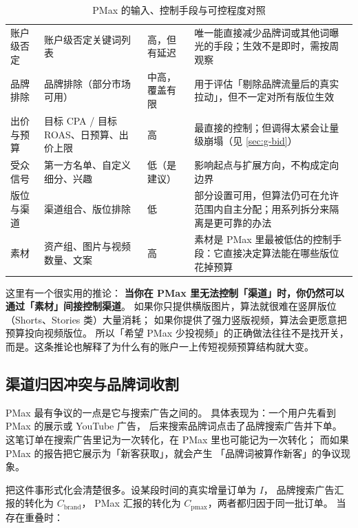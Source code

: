\begin{table}[htbp]
\centering
\caption{PMax 的输入、控制手段与可控程度对照}
\label{tab:g-pmax-control}
\small
\begin{tabularx}{\textwidth}{L{2.5cm} L{2.7cm} L{3.0cm} Y}
\toprule
{} &  &  &  \\
\midrule
账户级否定 & 账户级否定关键词列表 & 高，但有延迟 & 唯一能直接减少品牌词或其他词曝光的手段；生效不是即时，需按周观察 \\
\addlinespace
品牌排除 & 品牌排除（部分市场可用） & 中高，覆盖有限 & 用于评估「剔除品牌流量后的真实拉动」，但不一定对所有版位生效 \\
\addlinespace
出价与预算 & 目标 CPA / 目标 ROAS、日预算、出价上限 & 高 & 最直接的控制；但调得太紧会让量级崩塌（见 \cref{sec:g-bid}） \\
\addlinespace
受众信号 & 第一方名单、自定义细分、兴趣 & 低（是建议） & 影响起点与扩展方向，不构成定向边界 \\
\addlinespace
版位与渠道 & 渠道组合、版位排除 & 低 & 部分设置可用，但算法仍可在允许范围内自主分配；用系列拆分来隔离是更可靠的办法 \\
\addlinespace
素材 & 资产组、图片与视频数量、文案 & 高 & 素材是 PMax 里最被低估的控制手段：它直接决定算法能在哪些版位花掉预算 \\
\bottomrule
\end{tabularx}
\end{table}

这里有一个很实用的推论：
\textbf{当你在 PMax 里无法控制「渠道」时，你仍然可以通过「素材」间接控制渠道}。
如果你只提供横版图片，算法就很难在竖屏版位（Shorts、Stories 类）大量消耗；
如果你提供了强力竖版视频，算法会更愿意把预算投向视频版位。
所以「希望 PMax 少投视频」的正确做法往往不是找开关，
而是。这条推论也解释了为什么有的账户一上传短视频预算结构就大变。

\subsection{渠道归因冲突与品牌词收割}

PMax 最有争议的一点是它与搜索广告之间的。
具体表现为：一个用户先看到 PMax 的展示或 YouTube 广告，
后来搜索品牌词点击了品牌搜索广告并下单。
这笔订单在搜索广告里记为一次转化，在 PMax 里也可能记为一次转化；
而如果 PMax 的报告把它展示为「新客获取」，就会产生
「品牌词被算作新客」的争议现象。

把这件事形式化会清楚很多。设某段时间的真实增量订单为 $I$，
品牌搜索广告汇报的转化为 $C_{\text{brand}}$，
PMax 汇报的转化为 $C_{\text{pmax}}$，两者都归因于同一批订单。
当存在重叠时：

